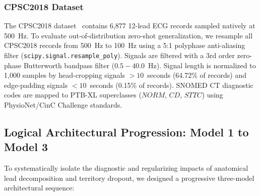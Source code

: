 \documentclass[12pt]{elsarticle}
\begin{document}
\subsubsection{CPSC2018 Dataset}
The CPSC2018 dataset~\cite{liu2018open} contains 6,877 12-lead ECG records sampled natively at 500~Hz. To evaluate out-of-distribution zero-shot generalization, we resample all CPSC2018 records from 500~Hz to 100~Hz using a 5:1 polyphase anti-aliasing filter (\texttt{scipy.signal.resample\_poly}). Signals are filtered with a 3rd order zero-phase Butterworth bandpass filter ($0.5 - 40.0$~Hz). Signal length is normalized to 1,000 samples by head-cropping signals $> 10$~seconds (64.72\% of records) and edge-padding signals $< 10$~seconds (0.15\% of records). SNOMED CT diagnostic codes are mapped to PTB-XL superclasses ($NORM$, $CD$, $STTC$) using PhysioNet/CinC Challenge standards.

\subsection{Logical Architectural Progression: Model 1 to Model 3}
To systematically isolate the diagnostic and regularizing impacts of anatomical lead decomposition and territory dropout, we designed a progressive three-model architectural sequence:
\end{document}

